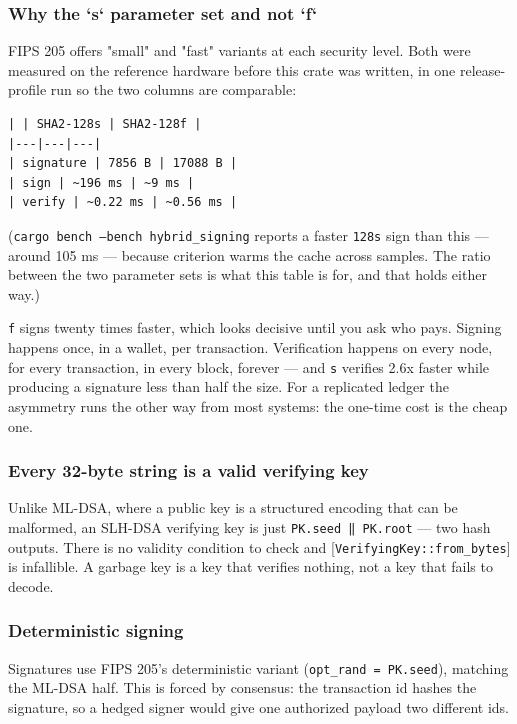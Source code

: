 \documentclass[11pt,a4paper]{article}
\begin{document}
\subsubsection{Why the `s` parameter set and not `f`}

FIPS 205 offers "small" and "fast" variants at each security level. Both
were measured on the reference hardware before this crate was written, in
one release-profile run so the two columns are comparable:

\begin{verbatim}
| | SHA2-128s | SHA2-128f |
|---|---|---|
| signature | 7856 B | 17088 B |
| sign | ~196 ms | ~9 ms |
| verify | ~0.22 ms | ~0.56 ms |
\end{verbatim}

(\texttt{cargo bench --bench hybrid\_signing} reports a faster \texttt{128s} sign than this
— around 105 ms — because criterion warms the cache across samples. The
ratio between the two parameter sets is what this table is for, and that
holds either way.)

\texttt{f} signs twenty times faster, which looks decisive until you ask who pays.
Signing happens once, in a wallet, per transaction. Verification happens on
every node, for every transaction, in every block, forever — and \texttt{s}
verifies 2.6x faster while producing a signature less than half the size.
For a replicated ledger the asymmetry runs the other way from most systems:
the one-time cost is the cheap one.

\subsubsection{Every 32-byte string is a valid verifying key}

Unlike ML-DSA, where a public key is a structured encoding that can be
malformed, an SLH-DSA verifying key is just \texttt{PK.seed ‖ PK.root} — two hash
outputs. There is no validity condition to check and
[\texttt{VerifyingKey::from\_bytes}] is infallible. A garbage key is a key that
verifies nothing, not a key that fails to decode.

\subsubsection{Deterministic signing}

Signatures use FIPS 205's deterministic variant (\texttt{opt\_rand = PK.seed}),
matching the ML-DSA half. This is forced by consensus: the transaction id
hashes the signature, so a hedged signer would give one authorized payload
two different ids.
\end{document}
